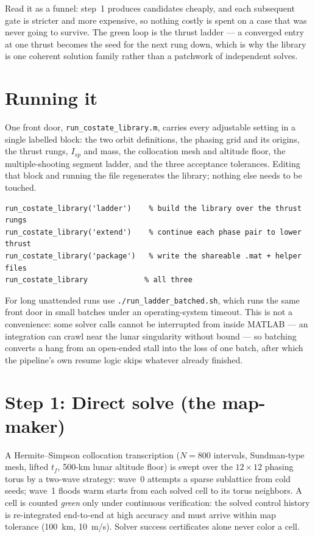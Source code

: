 \documentclass[11pt]{article}
\begin{document}
\noindent
Read it as a funnel: step~1 produces candidates cheaply, and each subsequent
gate is stricter and more expensive, so nothing costly is spent on a case that
was never going to survive. The green loop is the thrust ladder --- a
converged entry at one thrust becomes the seed for the next rung down, which
is why the library is one coherent solution family rather than a patchwork of
independent solves.

\section{Running it}

One front door, \texttt{run\_costate\_library.m}, carries every adjustable
setting in a single labelled block: the two orbit definitions, the phasing
grid and its origins, the thrust rungs, $I_{sp}$ and mass, the collocation
mesh and altitude floor, the multiple-shooting segment ladder, and the three
acceptance tolerances. Editing that block and running the file regenerates the
library; nothing else needs to be touched.

\begin{verbatim}
run_costate_library('ladder')    % build the library over the thrust rungs
run_costate_library('extend')    % continue each phase pair to lower thrust
run_costate_library('package')   % write the shareable .mat + helper files
run_costate_library             % all three
\end{verbatim}

For long unattended runs use \texttt{./run\_ladder\_batched.sh}, which runs
the same front door in small batches under an operating-system timeout. This
is not a convenience: some solver calls cannot be interrupted from inside
MATLAB --- an integration can crawl near the lunar singularity without bound
--- so batching converts a hang from an open-ended stall into the loss of one
batch, after which the pipeline's own resume logic skips whatever already
finished.

\section{Step 1: Direct solve (the map-maker)}

A Hermite--Simpson collocation transcription ($N=800$ intervals, Sundman-type
mesh, lifted $t_f$, 500-km lunar altitude floor) is swept over the
$12\times12$ phasing torus by a two-wave strategy: wave~0 attempts a sparse
sublattice from cold seeds; wave~1 floods warm starts from each solved cell to
its torus neighbors. A cell is counted \emph{green} only under continuous
verification: the solved control history is re-integrated end-to-end at high
accuracy and must arrive within map tolerance (100~km, 10~m/s). Solver
success certificates alone never color a cell.
\end{document}

